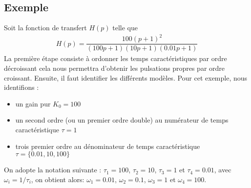 \subsection*{Exemple}
Soit la fonction de transfert $H(p)$ telle que 
\begin{align}
    H(p) = \dfrac{100(p+1)^2}{(100p+1)(10p+1)(0.01p+1)}\label{eq-ft_qq}
\end{align}
La première étape consiste à ordonner les temps caractéristiques par ordre 
décroissant cela nous permettra d'obtenir les pulsations propres par ordre 
croissant. Ensuite, il faut identifier les différents modèles.
Pour cet exemple, nous identifions :
\begin{itemize}
    \item un gain pur $K_0=100$
    \item un second ordre (ou un premier ordre double) au numérateur de 
          temps caractéristique $\tau=1$
    \item trois premier ordre au dénominateur de temps caractéristique 
          $\tau=\{0.01,10,100\}$
\end{itemize}
On adopte la notation suivante : $\tau_1=100$, $\tau_2=10$, $\tau_3=1$ 
et $\tau_4=0.01$, avec $\omega_i=1/\tau_i$, on obtient alors:
$\omega_1=0.01$, $\omega_2=0.1$, $\omega_3=1$ et $\omega_4=100$.

